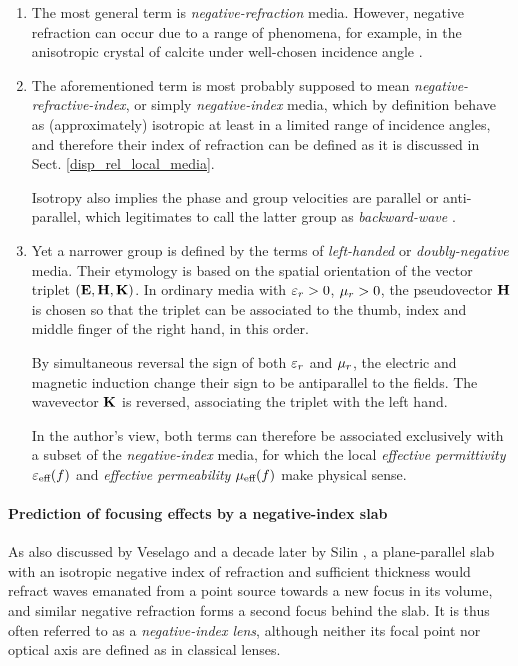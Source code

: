 \begin{enumerate}
\item{The most general term is \textit{negative-refraction} media. %
	However, negative refraction can occur due to a range of phenomena, for example, in the anisotropic crystal of calcite under well-chosen incidence angle \cite{agranovich2006spatial}.} 
\item{The aforementioned term is most probably supposed to mean \textit{negative-refractive-index}, or simply \textit{negative-index} media, which by definition behave as (approximately) isotropic at least in a limited range of incidence angles, and therefore their index of refraction can be defined as it is discussed in Sect. \ref{disp_rel_local_media}. 
	
Isotropy also implies the phase and group velocities are parallel or anti-parallel, which legitimates to call the latter group as \textit{backward-wave} \cite{lindell2001bw}.} 

\item{Yet a narrower group is defined by the terms of \textit{left-handed} \cite{veselago1968} or \textit{doubly-negative} media. Their etymology is based on the spatial orientation of the vector triplet $(\mathbf{E}, \mathbf{H}, {\mathbf{K}})$. In ordinary media with $\varepsilon_r > 0$, $\mu_r > 0$, the pseudovector $\mathbf{H}$ is chosen so that the triplet can be associated to the thumb, index and middle finger of the right hand, in this order. 

By simultaneous reversal the sign of both $\varepsilon_r$ and $\mu_r$, the electric and magnetic induction change their sign to be antiparallel to the fields. The wavevector ${\mathbf{K}}$ is reversed, associating the triplet with the left hand. 

In the author's view, both terms can therefore be associated exclusively with a subset of the \textit{negative-index} media, for which the local \textit{effective permittivity} $\varepsilon_{\text{eff} }(f)$ and \textit{effective permeability} $\mu_{\text{eff} }(f)$ make physical sense. %
}
\end{enumerate}

\paragraph{Prediction of focusing effects by a negative-index slab} %
As also discussed by Veselago \cite[p. 511]{veselago1968} and a decade later by Silin \cite{silin1978possibility},  %
a plane-parallel slab with an isotropic negative index of refraction and sufficient thickness would refract waves emanated from a point source towards a new focus in its volume, and similar negative refraction forms a second focus behind the slab. It is thus often referred to as a \textit{negative-index lens}, although neither its focal point nor optical axis are defined as in classical lenses.

